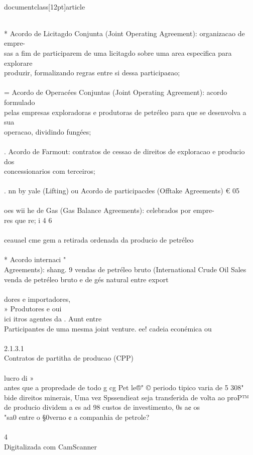 \\documentclass[12pt]{article}
\begin{document}
\\
* Acordo de Licitagdo Conjunta (Joint Operating Agreement): organizacao de empre-\\
sas a fim de participarem de uma licitagdo sobre uma area especifica para explorare\\
produzir, formalizando regras entre si dessa participa¢ao;\\
\\
= Acordo de Operacées Conjuntas (Joint Operating Agreement): acordo formulado\\
pelas empresas exploradoras e produtoras de petréleo para que se desenvolva a sua\\
operacao, dividindo fungées;\\
\\
. Acordo de Farmout: contratos de cessao de direitos de exploracao e producio dos\\
concessionarios com terceiros;\\
\\
. nn by yale (Lifting) ou Acordo de participacdes (Offtake Agreements) € 05\\
\\
oes wii he de Gas (Gas Balance Agreements): celebrados por empre-\\
res que re; i 4 6\\
\\
ceauael cme gem a retirada ordenada da producio de petréleo\\
\\
* Acordo internaci "\\
Agreements): shang. 9 vendas de petréleo bruto (International Crude Oil Sales\\
venda de petréleo bruto e de gés natural entre export\\
\\
dores e importadores,\\
» Produtores e oui\\
ici itros agentes da . Aunt entre\\
Participantes de uma mesma joint venture. ee! cadeia econémica ou\\
\\
2.1.3.1\\
Contratos de partitha de producao (CPP)\\
\\
lucro di »\\
antes que a propredade de todo g cg Pet le®" © periodo tipico varia de 5 308"\\
bide direitos minerais, Uma vez Spssendieat seja transferida de volta ao proP™\\
de producio dividem a es ad 98 custos de investimento, 0s a¢ os\\
"sa0 entre o §0verno ¢ a companhia de petrole?\\
\\
4\\
Digitalizada com CamScanner\\
\end{document}
